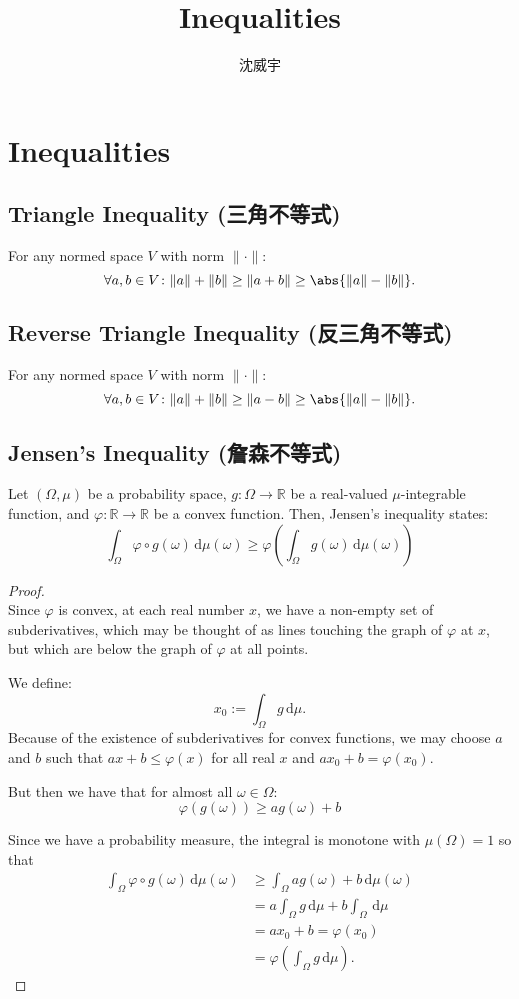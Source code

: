\documentclass[a4paper,12pt]{article}
\begin{document}
\title{Inequalities}
\author{沈威宇}
\date{\temtoday}
\titletocdoc
\section{Inequalities}
\subsection{Triangle Inequality (三角不等式)}
For any normed space $V$ with norm $\|\cdot\|$:
\[\forall a,b\in V\colon\|a\|+\|b\|\geq\|a+b\|\geq\abs{\|a\|-\|b\|}.\]
\subsection{Reverse Triangle Inequality (反三角不等式)}
For any normed space $V$ with norm $\|\cdot\|$:
\[\forall a,b\in V\colon\|a\|+\|b\|\geq\|a-b\|\geq\abs{\|a\|-\|b\|}.\]
\subsection{Jensen's Inequality (詹森不等式)}
Let \((\Omega, \mu)\) be a probability space, \( g: \Omega \to \mathbb{R} \) be a real-valued \( \mu \)-integrable function, and \( \varphi: \mathbb{R} \to \mathbb{R} \) be a convex function. Then, Jensen's inequality states:
\[ \int_{\Omega} \varphi\circ g(\omega) \, \mathrm{d}\mu(\omega) \geq \varphi \left( \int_{\Omega} g(\omega) \,\mathrm{d}\mu(\omega) \right)\]
\begin{proof}\mbox{}\\
Since $\varphi$ is convex, at each real number $x$, we have a non-empty set of subderivatives, which may be thought of as lines touching the graph of $\varphi$ at $x$, but which are below the graph of $\varphi$ at all points. 

We define:
\[x_{0} := \int _{\Omega } g \,\mathrm{d}\mu.\]
Because of the existence of subderivatives for convex functions, we may choose $a$ and $b$ such that $ax + b \leq \varphi (x)$ for all real $x$ and $ax_{0} + b = \varphi (x_{0})$.

But then we have that for almost all $\omega \in \Omega$:
\[ \varphi (g(\omega)) \geq ag(\omega) + b \] 

Since we have a probability measure, the integral is monotone with $\mu (\Omega) = 1$ so that
\[\begin{aligned}
\int _{\Omega} \varphi\circ g(\omega)\, \mathrm{d}\mu(\omega) &\geq \int _{\Omega} ag(\omega) + b \, \mathrm{d}\mu(\omega) \\
&= a\int _{\Omega} g \, \mathrm{d}\mu + b \int _{\Omega} \, \mathrm{d}\mu \\
&= ax_{0} + b = \varphi (x_{0}) \\
&= \varphi \left(\int _{\Omega} g \, \mathrm{d}\mu \right).
\end{aligned}\]
\end{proof}
\end{document}
